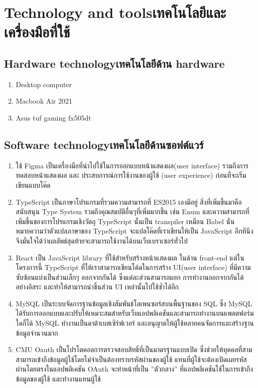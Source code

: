 \section{\ifenglish Technology and tools\else เทคโนโลยีและเครื่องมือที่ใช้\fi}

\subsection{\ifenglish Hardware technology\else เทคโนโลยีด้าน hardware\fi}
\begin{enumerate}
    \item Desktop computer
    \item Macbook Air 2021
    \item Asus tuf gaming fx505dt
\end{enumerate}


\subsection{\ifenglish Software technology\else เทคโนโลยีด้านซอฟต์แวร์\fi}
\begin{enumerate}
    \item ใช้ Figma\cite{Figma} เป็นเครื่องมือที่นำไปใช้ในการออกแบบหน้าแสดงผล(user interface) รวมถึงการทดสอบหน้าแสดงผล และ ประสบการณ์การใช้งานของผู้ใช้ (user experience) ก่อนที่จะเริ่มเขียนแบบโค๊ด
    \item TypeScript\cite{TypeScript} เป็นภาษาโปรแกรมที่รวมความสามารถที่ ES2015 เองมีอยู่ สิ่งที่เพิ่มขึ้นมาคือสนับสนุน Type System รวมถึงคุณสมบัติอื่นๆที่เพิ่มมากขึ้น เช่น Enum และความสามารถที่เพิ่มขึ้นของการโปรแกรมเชิงวัตถุ TypeScript นั้นเป็น transpiler เหมือน Babel นั่นหมายความว่าตัวแปลภาษาของ TypeScript จะแปลโค๊ดที่เราเขียนให้เป็น JavaScript อีกทีนึง จึงมั่นใจได้ว่าผลลัพธ์สุดท้ายจะสามารถใช้งานได้บนเว็บเบราเซอร์ทั่วไป
    \item React\cite{ReactJS} เป็น JavaScript library ที่ใช้สําหรับสร้างหน้าแสดงผล ในด้าน front-end แต่ในโครงการนี้ TypeScript ที่ให้เราสามารถเขียนโค้ดในการสร้าง UI(user interface) ที่มีความซับซ้อนแบ่งเป็นส่วนเล็กๆ ออกจากกันได้ ซึ่งแต่ละส่วนสามารถแยก การทํางานออกจากกันได้อย่างอิสระ และทําให้สามารถนําชิ้นส่วน UI เหล่านั้นไปใช้ซํ้าได้อีก
    \item MySQL \cite{MySQL} เป็นระบบจัดการฐานข้อมูลเชิงสัมพันธ์โอเพนซอร์สบนพื้นฐานของ SQL ซึ่ง MySQL ได้รับการออกแบบและปรับให้เหมาะสมสำหรับเว็บแอปพลิเคชันและสามารถทำงานบนแพลตฟอร์มใดก็ได้ MySQL ทำงานเป็นดาต้าเบสเซิร์ฟเวอร์ และอนุญาตให้ผู้ใช้หลายคนจัดการและสร้างฐานข้อมูลจำนวนมาก
    \item CMU Oauth\cite{CMU_OAuth} เป็นโปรโตคอลการตรวจสอบสิทธิ์ที่เป็นมาตรฐานแบบเปิด ซึ่งช่วยให้บุคคลที่สามสามารถเข้าถึงข้อมูลผู้ใช้โดยไม่จําเป็นต้องทราบรหัสผ่านของผู้ใช้ แทนที่ผู้ใช้จะต้องเปิดเผยรหัสผ่านโดยตรงในแอปพลิเคชัน OAuth จะทําหน้าที่เป็น ”ตัวกลาง” ที่แอปพลิเคชันใช้ในการเข้าถึงข้อมูลของผู้ใช้ และทํางานแทนผู้ใช้

\end{enumerate}

